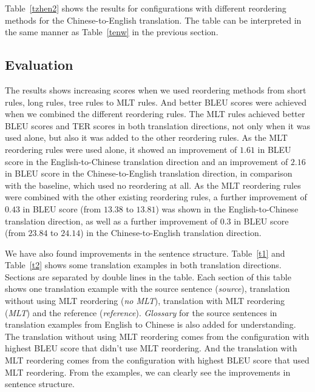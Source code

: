 \documentclass[a4paper]{article}
\begin{document}
Table~\ref{tzhen2} shows the results for configurations with different reordering methods for the Chinese-to-English translation. The table can be interpreted in the same manner as Table~\ref{tenw} in the previous section.

\subsection{Evaluation}

The results shows increasing scores when we used reordering methods from short rules, long rules, tree rules to MLT rules. And better BLEU scores were achieved when we combined the different reordering rules. The MLT rules achieved better BLEU scores and TER scores in both translation directions, not only when it was used alone, but also it was added to the other reordering rules. As the MLT reordering rules were used alone, it showed an improvement of $1.61$ in BLEU score in the English-to-Chinese translation direction and an improvement of $2.16$ in BLEU score in the Chinese-to-English translation direction, in comparison with the baseline, which used no reordering at all. As the MLT reordering rules were combined with the other existing reordering rules, a further improvement of $0.43$ in BLEU score (from $13.38$ to $13.81$) was shown in the English-to-Chinese translation direction, as well as a further improvement of $0.3$ in BLEU score (from $23.84$ to $24.14$) in the Chinese-to-English translation direction.

We have also found improvements in the sentence structure. Table~\ref{t1} and Table~\ref{t2} shows some translation examples in both translation directions. Sections are separated by double lines in the table. Each section of this table shows one translation example with the source sentence (\emph{source}), translation without using MLT reordering (\emph{no MLT}), translation with MLT reordering (\emph{MLT}) and the reference (\emph{reference}). \emph{Glossary} for the source sentences in translation examples from English to Chinese is also added for understanding. The translation without using MLT reordering comes from the configuration with highest BLEU score that didn't use MLT reordering. And the translation with MLT reordering comes from the configuration with highest BLEU score that used MLT reordering. From the examples, we can clearly see the improvements in sentence structure.

\end{document}
